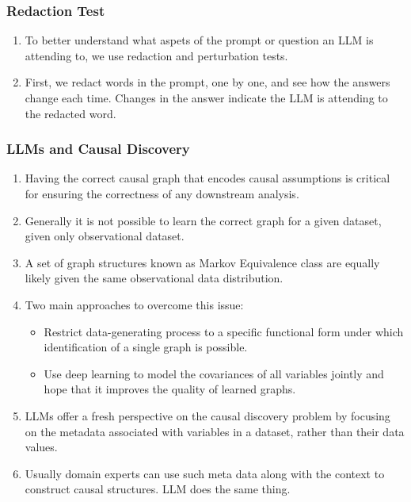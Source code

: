 \documentclass{beamer}
\begin{document}
\begin{frame}
	\frametitle{Redaction Test}
	\begin{enumerate}
		\item To better understand what aspets of the prompt or
			question an LLM is attending to, we use redaction and
			perturbation tests.
		\item First, we redact words in the prompt, one by one, and see how 
			the answers change each time. Changes in the answer indicate
			the LLM is attending to the redacted word.
	\end{enumerate}
\end{frame}

\begin{frame}
	\frametitle{LLMs and Causal Discovery}
	\begin{enumerate}
		\item Having the correct causal graph that encodes causal assumptions
			is critical for ensuring the correctness of any downstream
			analysis.
		\item Generally it is not possible to learn the correct graph for
			a given dataset, given only observational dataset.
		\item A set of graph structures known as Markov Equivalence
			class are equally likely given the same observational
			data distribution.
		\item Two main approaches to overcome this issue:
			\begin{itemize}
				\item Restrict data-generating process to a specific
					functional form under which identification
					of a single graph is possible.
				\item Use deep learning to model the covariances of
					all variables jointly and hope that it improves
					the quality of learned graphs.
			\end{itemize}
		\item LLMs offer a fresh perspective on the causal discovery problem
			by focusing on the metadata associated with variables in a 
			dataset, rather than their data values.
		\item Usually domain experts can use such meta data along with the 
			context to construct causal structures. LLM does the same 
			thing.
	\end{enumerate}
\end{frame}
\end{document}
